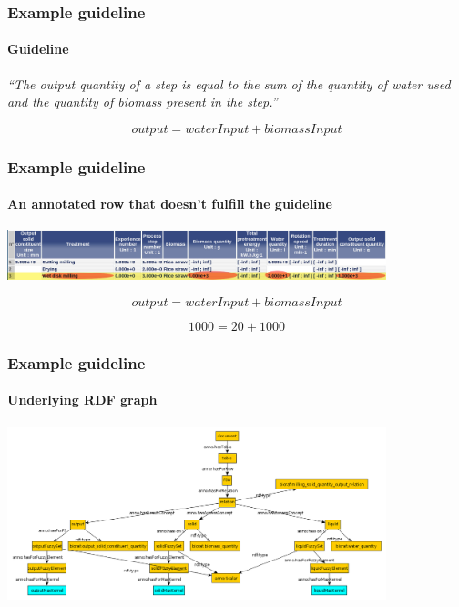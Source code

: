 \documentclass{beamer}
\begin{document}
\begin{frame}
  \frametitle{Example guideline}
  \framesubtitle{Guideline}

  \textit{``The output quantity of a step is equal to the sum of the quantity
  of water used and the quantity of biomass present in the step.''}

  \pause

  $$output = waterInput + biomassInput$$
\end{frame}

\begin{frame}
  \frametitle{Example guideline}
  \framesubtitle{An annotated row that doesn't fulfill the guideline}

  \begin{center}
    \includegraphics[width=11cm]{atweb-screenshot-row-with-relation.jpg}
  \end{center}

  \pause

  $$output = waterInput + biomassInput$$

  \pause

  {
    \color{red}
    $$1000 = 20 + 1000$$
  }
\end{frame}

\begin{frame}
  \frametitle{Example guideline}
  \framesubtitle{Underlying RDF graph}

  \begin{center}
    \includegraphics[width=11cm]{underlying-graph.png}
  \end{center}
\end{frame}

\end{document}
